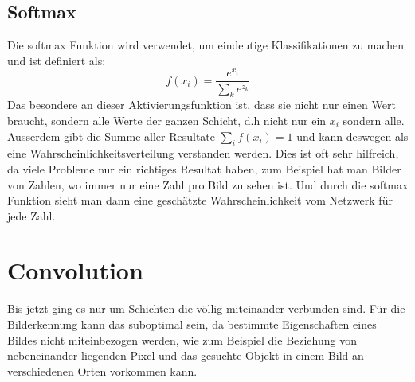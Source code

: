 \documentclass[12pt,a4paper]{report}
\begin{document}
\subsection{Softmax}
Die softmax Funktion wird verwendet, um eindeutige Klassifikationen zu machen und ist definiert als:
\[f(x_i) = \frac{e^{x_i}}{\sum_k{e^{z_k}}}\]
Das besondere an dieser Aktivierungsfunktion ist, dass sie nicht nur einen Wert braucht, sondern alle Werte der ganzen Schicht,
d.h nicht nur ein $x_i$ sondern alle.
Ausserdem gibt die Summe aller Resultate $\sum_i f(x_i) = 1$ und kann deswegen als eine Wahrscheinlichkeitsverteilung verstanden werden.
Dies ist oft sehr hilfreich, da viele Probleme nur ein richtiges Resultat haben, zum Beispiel hat man Bilder von Zahlen,
wo immer nur eine Zahl pro Bild zu sehen ist.
Und durch die softmax Funktion sieht man dann eine geschätzte Wahrscheinlichkeit vom Netzwerk für jede Zahl.
\section{Convolution}
Bis jetzt ging es nur um Schichten die völlig miteinander verbunden sind.
Für die Bilderkennung kann das suboptimal sein, da bestimmte Eigenschaften eines Bildes nicht miteinbezogen werden,
wie zum Beispiel die Beziehung von nebeneinander liegenden Pixel
und das gesuchte Objekt in einem Bild an verschiedenen Orten vorkommen kann.
\end{document}
